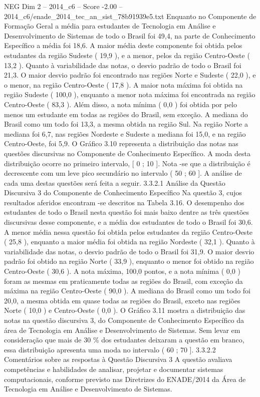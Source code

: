 \begin{textsample}{NEG Dim 2 – 2014\_c6 – Score -2.00 – 2014\_c6/enade\_2014\_tec\_an\_sist\_78b91939e5.txt}
Enquanto no Componente de Formação Geral a média para estudantes de Tecnologia em Análise e Desenvolvimento de Sistemas de todo o Brasil foi 49,4, na parte de Conhecimento Específico a média foi 18,6.
A maior média deste componente foi obtida pelos estudantes da região Sudeste ( 19,9 ), e a menor, pelos da região Centro-Oeste ( 13,2 ).
Quanto à variabilidade das notas, o desvio padrão de todo o Brasil foi 21,3.
O maior desvio padrão foi encontrado nas regiões Norte e Sudeste ( 22,0 ), e o menor, na região Centro-Oeste ( 17,8 ).
A maior nota máxima foi obtida na região Sudeste ( 100,0 ), enquanto a menor nota máxima foi encontrada na região Centro-Oeste ( 83,3 ).
Além disso, a nota mínima ( 0,0 ) foi obtida por pelo menos um estudante em todas as regiões do Brasil, sem exceção.
A mediana do Brasil como um todo foi 13,3, a mesma obtida na região Sul.
Na região Norte a mediana foi 6,7, nas regiões Nordeste e Sudeste a mediana foi 15,0, e na região Centro-Oeste, foi 5,9.
O Gráfico 3.10 representa a distribuição das notas nas questões discursivas no Componente de Conhecimento Específico.
A moda desta distribuição ocorre no primeiro intervalo, [ 0 ; 10 ].
Nota -se que a distribuição é decrescente com um leve pico secundário no intervalo ( 50 ; 60 ].
A análise de cada uma destas questões será feita a seguir. 3.3.2.1 Análise da Questão Discursiva 3 do Componente de Conhecimento Específico Na questão 3, cujos resultados aferidos encontram -se descritos na Tabela 3.16.
O desempenho dos estudantes de todo o Brasil nesta questão foi mais baixo dentre as três questões discursivas desse componente, e a média dos estudantes de todo o Brasil foi 30,6.
A menor média nessa questão foi obtida pelos estudantes da região Centro-Oeste ( 25,8 ), enquanto a maior média foi obtida na região Nordeste ( 32,1 ).
Quanto à variabilidade das notas, o desvio padrão de todo o Brasil foi 31,9.
O maior desvio padrão foi obtido na região Norte ( 33,9 ), enquanto o menor foi obtido na região Centro-Oeste ( 30,6 ).
A nota máxima, 100,0 pontos, e a nota mínima ( 0,0 ) foram as mesmas em praticamente todas as regiões do Brasil, com exceção da máxima na região Centro-Oeste ( 90,0 ).
A mediana do Brasil como um todo foi 20,0, a mesma obtida em quase todas as regiões do Brasil, exceto nas regiões Norte ( 10,0 ) e Centro-Oeste ( 0,0 ).
O Gráfico 3.11 mostra a distribuição das notas na questão discursiva 3, do Componente de Conhecimento Específico da área de Tecnologia em Análise e Desenvolvimento de Sistemas.
Sem levar em consideração que mais de 30 \% dos estudantes deixaram a questão em branco, essa distribuição apresenta uma moda no intervalo ( 60 ; 70 ]. 3.3.2.2 Comentários sobre as respostas à Questão Discursiva 3 A questão avaliava competências e habilidades de analisar, projetar e documentar sistemas computacionais, conforme previsto nas Diretrizes do ENADE/2014 da Área de Tecnologia em Análise e Desenvolvimento de Sistemas.

\end{textsample}
